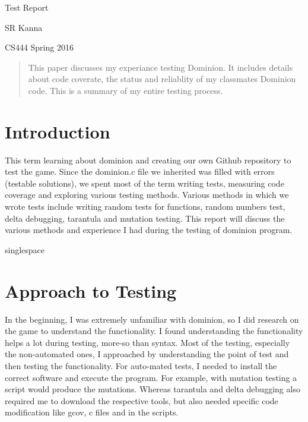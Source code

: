 \documentclass[titlepage]{article}
\begin{document}
\begin{titlepage}
\centering
{\Huge Test Report\par}
{\LARGE SR Kanna\par}
{\Large CS444 Spring 2016\par}

\begin{abstract}
This paper discusses my experiance testing Dominion. It includes details about code coverate, the status and reliablity of my classmates Dominion code. This is a summary of my entire testing process.

\end{abstract}

\end{titlepage}

\section{Introduction}
\begin{singlespace}
This term learning about dominion and creating our own Github repository to test the game. Since the dominion.c file we inherited was filled with errors (testable solutions), we spent most of the term writing tests, measuring code coverage and exploring various testing methods. Various methods in which we wrote tests include writing random tests for functions, random numbers test, delta debugging, tarantula and mutation testing. This report will discuss the various methods and experience I had during the testing of dominion program.
\end{singlespace}
{singlespace}

\section{Approach to Testing}
\begin{singlespace}
	In the beginning, I was extremely unfamiliar with dominion, so I did research on the game to understand the functionality. I found understanding the functionality helps a lot during testing, more-so than syntax. Most of the testing, especially the non-automated ones, I approached by understanding the point of test and then testing the functionality. For auto-mated tests, I needed to install the correct software and execute the program. For example, with mutation testing a script would produce the mutations. Whereas tarantula and delta debugging also required me to download the respective tools, but also needed specific code modification like gcov, c files and in the scripts. 
\end{singlespace}
\end{document}
